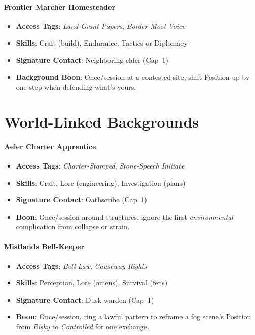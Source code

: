 \paragraph{Frontier Marcher Homesteader}
\begin{itemize}
\item \textbf{Access Tags}: \textit{Land-Grant Papers}, \textit{Border Moot Voice}
\item \textbf{Skills}: Craft (build), Endurance, Tactics or Diplomacy
\item \textbf{Signature Contact}: Neighboring elder (Cap~1)
\item \textbf{Background Boon}: Once/session at a contested site, shift Position up by one step when defending what's yours.
\end{itemize}

\section{World-Linked Backgrounds}

\paragraph{Aeler Charter Apprentice}
\begin{itemize}
\item \textbf{Access Tags}: \textit{Charter-Stamped}, \textit{Stone-Speech Initiate}
\item \textbf{Skills}: Craft, Lore (engineering), Investigation (plans)
\item \textbf{Signature Contact}: Oathscribe (Cap~1)
\item \textbf{Boon}: Once/session around structures, ignore the first \emph{environmental} complication from collapse or strain.
\end{itemize}

\paragraph{Mistlands Bell-Keeper}
\begin{itemize}
\item \textbf{Access Tags}: \textit{Bell-Law}, \textit{Causeway Rights}
\item \textbf{Skills}: Perception, Lore (omens), Survival (fens)
\item \textbf{Signature Contact}: Dusk-warden (Cap~1)
\item \textbf{Boon}: Once/session, ring a lawful pattern to reframe a fog scene's Position from \emph{Risky} to \emph{Controlled} for one exchange.
\end{itemize}

